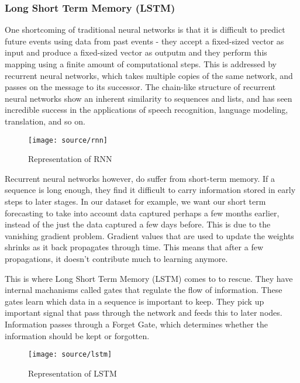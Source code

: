 \documentclass[12pt,twocolumn]{article}
\begin{document}
			\subsubsection*{Long Short Term Memory (LSTM)}
				\quad One shortcoming of traditional neural networks is that it is difficult to predict future events using data from past events - they accept a fixed-sized vector as input and produce a fixed-sized vector as outputm and they perform this mapping using a finite amount of computational steps. This is addressed by recurrent neural networks, which takes multiple copies of the same network, and passes on the message to its successor. The chain-like structure of recurrent neural networks show an inherent similarity to sequences and lists, and has seen incredible success in the applications of speech recognition, language modeling, translation, and so on. 

				\begin{figure}[!htbp]
					\centering
					\texttt{[image: source/rnn]}
					\caption{Representation of RNN}
				\end{figure}

				\quad Recurrent neural networks however, do suffer from short-term memory. If a sequence is long enough, they find it difficult to carry information stored in early steps to later stages. In our dataset for example, we want our short term forecasting to take into account data captured perhaps a few months earlier, instead of the just the data captured a few days before. This is due to the vanishing gradient problem. Gradient values that are used to update the weights shrinks as it back propagates through time. This means that after a few propagations, it doesn't contribute much to learning anymore. \newline

				\quad This is where Long Short Term Memory (LSTM) comes to to rescue. They have internal machanisms called gates that regulate the flow of information. These gates learn which data in a sequence is important to keep. They pick up important signal that pass through the network and feeds this to later nodes. Information passes through a Forget Gate, which determines whether the information should be kept or forgotten. 

				\begin{figure}[!htbp]
					\centering
					\texttt{[image: source/lstm]}
					\caption{Representation of LSTM}
				\end{figure}
\end{document}

